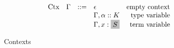 \documentclass[../plutus-core-specification.tex]{subfiles}
\begin{document}
\begin{figure*}[h]
    \[\begin{array}{lrclr}
        \textrm{Ctx} & \Gamma  & ::= & \epsilon                    & \textrm{empty context} \\
                     &         &     & \Gamma, \typeJ{\alpha}{K}   & \textrm{type variable} \\
                     &         &     & \Gamma, \termJ{x}{\diffbox{S}}        & \textrm{term variable} \\
    \end{array}\]

    \caption{Contexts}
    \label{fig:Plutus_core_contexts_algorithmic_unrestricted}
\end{figure*}

\begin{figure*}[h]

    \begin{prooftree}
    \end{prooftree}

    \begin{prooftree}
    \end{prooftree}

    \begin{prooftree}
    \end{prooftree}

    \begin{prooftree}
    \end{prooftree}

    \begin{prooftree}
    \end{prooftree}
    

\end{figure*}
\end{document}
